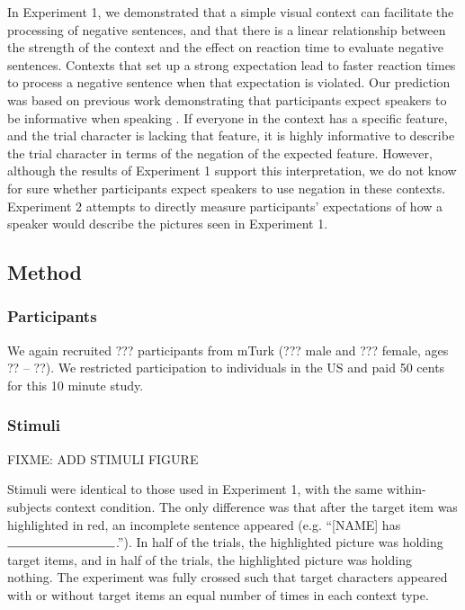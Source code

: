 \documentclass[man]{apa2}
\begin{document}
In Experiment 1, we demonstrated that a simple visual context can facilitate the processing of negative sentences, and that there is a linear relationship between the strength of the context and the effect on reaction time to evaluate negative sentences.  Contexts that set up a strong expectation lead to faster reaction times to process a negative sentence when that expectation is violated.  Our prediction was based on previous work demonstrating that participants expect speakers to be informative when speaking \cite{frank2012}.  If everyone in the context has a specific feature, and the trial character is lacking that feature, it is highly informative to describe the trial character in terms of the negation of the expected feature.  However, although the results of Experiment 1 support this interpretation, we do not know for sure whether participants expect speakers to use negation in these contexts.  Experiment 2 attempts to directly measure participants' expectations of how a speaker would describe the pictures seen in Experiment 1.

\subsection{Method}

\subsubsection{Participants} 

We again recruited ??? participants from mTurk (??? male and ??? female, ages ?? -- ??). We restricted participation to individuals in the US and paid 50 cents for this 10 minute study.  

\subsubsection{Stimuli}

FIXME: ADD STIMULI FIGURE

Stimuli were identical to those used in Experiment 1, with the same within-subjects context condition.  The only difference was that after the target item was highlighted in red, an incomplete sentence appeared (e.g. ``[NAME] has $\rule{3cm}{0.15mm}$.'').  In half of the trials, the highlighted picture was holding target items, and in half of the trials, the highlighted picture was holding nothing.  The experiment was fully crossed such that target characters appeared with or without target items an equal number of times in each context type.  
\end{document}
